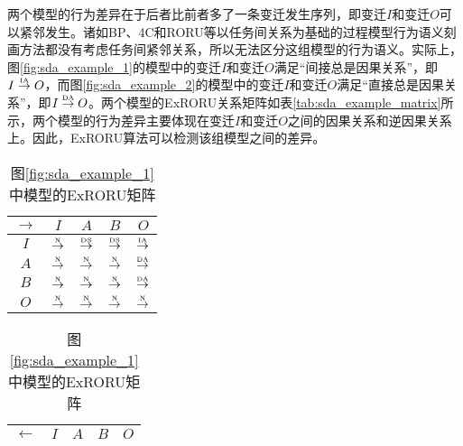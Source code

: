 两个模型的行为差异在于后者比前者多了一条变迁发生序列，即变迁$I$和变迁$O$可以紧邻发生。诸如BP、4C和RORU等以任务间关系为基础的过程模型行为语义刻画方法都没有考虑任务间紧邻关系，所以无法区分这组模型的行为语义。实际上，图\ref{fig:sda_example_1}的模型中的变迁$I$和变迁$O$满足“间接总是因果关系”，即$I\overset{\text{\tiny{IA}}}{\rightarrow}O$，而图\ref{fig:sda_example_2}的模型中的变迁$I$和变迁$O$满足“直接总是因果关系”，即$I\overset{\text{\tiny{DA}}}{\rightarrow}O$。两个模型的ExRORU关系矩阵如表\ref{tab:sda_example_matrix}所示，两个模型的行为差异主要体现在变迁$I$和变迁$O$之间的因果关系和逆因果关系上。因此，ExRORU算法可以检测该组模型之间的差异。

\begin{table}[htbp]
  \centering
  \caption{图\ref{fig:sda_example}中两个模型的ExRORU矩阵}
  \label{tab:sda_example_matrix}
  \begin{subtable}{1\textwidth}
    \centering
    \caption{图\ref{fig:sda_example_1}中模型的ExRORU矩阵}
    \label{tab:sda_example_1_matrix}
    \begin{minipage}[b]{0.3\textwidth}
      \centering
      \begin{tabular}{|c|c|c|c|c|} \hline
        $\rightarrow$ & $I$ & $A$ & $B$ & $O$\\ \hline
        $I$ & $\overset{\text{\tiny{N}}}{\rightarrow}$ & $\overset{\text{\tiny{DS}}}{\rightarrow}$ & $\overset{\text{\tiny{DS}}}{\rightarrow}$ & $\overset{\text{\tiny{IA}}}{\rightarrow}$\\ \hline
        $A$ & $\overset{\text{\tiny{N}}}{\rightarrow}$ & $\overset{\text{\tiny{N}}}{\rightarrow}$ & $\overset{\text{\tiny{N}}}{\rightarrow}$ & $\overset{\text{\tiny{DA}}}{\rightarrow}$\\ \hline
        $B$ & $\overset{\text{\tiny{N}}}{\rightarrow}$ & $\overset{\text{\tiny{N}}}{\rightarrow}$ & $\overset{\text{\tiny{N}}}{\rightarrow}$ & $\overset{\text{\tiny{DA}}}{\rightarrow}$\\ \hline
        $O$ & $\overset{\text{\tiny{N}}}{\rightarrow}$ & $\overset{\text{\tiny{N}}}{\rightarrow}$ & $\overset{\text{\tiny{N}}}{\rightarrow}$ & $\overset{\text{\tiny{N}}}{\rightarrow}$\\ \hline
      \end{tabular}
    \end{minipage}
    \begin{minipage}[b]{0.3\textwidth}
      \centering
      \begin{tabular}{|c|c|c|c|c|} \hline
        $\leftarrow$ & $I$ & $A$ & $B$ & $O$\\ \hline

\end{tabular}
\end{minipage}
\end{subtable}
\end{table}
